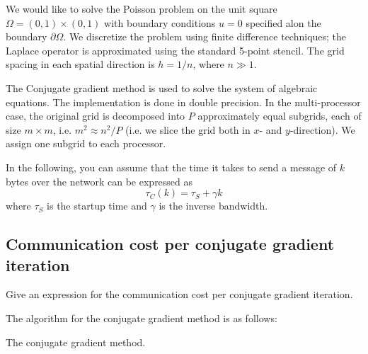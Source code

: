 \begin{question}
  We would like to solve the Poisson problem on the unit square $\Omega = (0,1) \times (0,1)$ with boundary conditions $u=0$ specified alon the boundary $\partial \Omega$. We discretize the problem using finite difference techniques; the Laplace operator is approximated using the standard 5-point stencil. The grid spacing in each spatial direction is $h=1/n$, where $n\gg 1$.

  The Conjugate gradient method is used to solve the system of algebraic equations. The implementation is done in double precision. In the multi-processor case, the original grid is decomposed into $P$ approximately equal subgrids, each of size $m\times m$, i.e. $m^2 \approx n^2/P$ (i.e. we slice the grid both in $x$- and $y$-direction). We assign one subgrid to each processor.

  In the following, you can assume that the time it takes to send a message of $k$ bytes over the network can be expressed as
  \begin{equation}
    \tau_C(k) = \tau_S + \gamma k
  \end{equation}
  where $\tau_S$ is the startup time and $\gamma$ is the inverse bandwidth.
\end{question}

\subsection{Communication cost per conjugate gradient iteration} %
\label{sub:communication_cost_per_conjugate_gradient_iteration}

\begin{question}
  Give an expression for the communication cost per conjugate gradient iteration.
\end{question}

The algorithm for the conjugate gradient method is as follows:

\begin{algorithm}[H]
  \caption{The conjugate gradient method.}
\end{algorithm}



